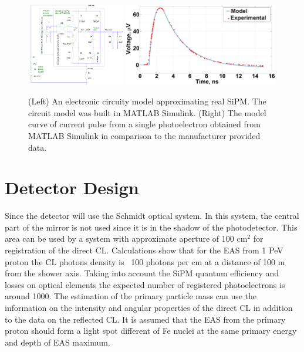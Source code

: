 \documentclass[a4paper]{jpconf}
\begin{document}
\begin{figure}[t]
\centering %
\includegraphics[width=0.38\textwidth]{Fig2_1.pdf}
\hfill
\includegraphics[width=0.60\textwidth]{Fig2_2.eps}
\caption{(Left) An electronic circuity model approximating real SiPM. The circuit model was built in MATLAB Simulink. (Right) The model curve of current pulse from a single photoelectron obtained from MATLAB Simulink in comparison to the manufacturer provided data.}
\label{fig:Sphere_results}
\end{figure}


\section{Detector Design}


Since the detector will use the Schmidt optical system. In this system, the central part of the mirror is not used since it is in the shadow of the photodetector. This area can be used by a system with approximate aperture of 100 cm$^2$ for registration of the direct CL. Calculations show that for the EAS from 1 PeV proton the CL photons density is ~100 photons per cm at a distance of 100 m from the shower axis. Taking into account the SiPM quantum efficiency and losses on optical elements the expected number of registered photoelectrons is around 1000. The estimation of the primary particle mass can use the information on the intensity and angular properties of the direct CL in addition to the data on the reflected CL. It is assumed that the EAS from the primary proton should form a light spot different of Fe nuclei at the same primary energy and depth of EAS maximum.
\end{document}
